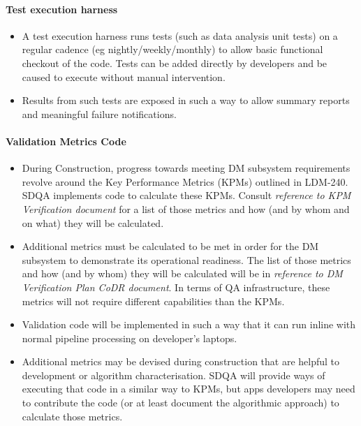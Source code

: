 \paragraph{Test execution harness}
\label{sec:qaTestharness}
\begin{itemize}

\item A test execution harness runs tests (such as data analysis unit tests) on a regular cadence (eg nightly/weekly/monthly) to allow basic functional checkout of the code. Tests can be added directly by developers and be caused to execute without manual intervention.

\item Results from such tests are exposed in such a way to allow summary reports and meaningful failure notifications. 

\end{itemize}

\paragraph{Validation Metrics Code}
\label{sec:qaValidate}
\begin{itemize}

\item During Construction, progress towards meeting DM subsystem requirements revolve around the Key Performance Metrics (KPMs) outlined in LDM-240. SDQA implements code to calculate these KPMs. Consult \emph{ reference to KPM Verification document} for a list of those metrics and how (and by whom and on what) they will be calculated. 

\item Additional metrics must be calculated to be met in order for the DM subsystem to demonstrate its operational readiness. The list of those metrics and how (and by whom) they will be calculated will be in \emph{reference to DM Verification Plan CoDR document}. In terms of QA infrastructure, these metrics will not require different capabilities than the KPMs.

\item Validation code will be implemented in such a way that it can run inline with normal pipeline processing on developer's laptops. 

\item Additional metrics may be devised during construction that are helpful to development or algorithm characterisation. SDQA will provide ways of executing that code in a similar way to KPMs, but apps developers may need to contribute the code (or at least document the algorithmic approach) to calculate those metrics.

\end{itemize}

